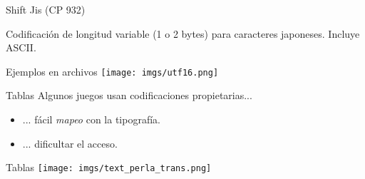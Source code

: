 \begin{frame}{Shift Jis (CP 932)}
    \begin{block}{}
        Codificación de longitud variable (1 o 2 bytes) para caracteres japoneses. Incluye ASCII.
    \end{block}
\end{frame}

\begin{frame}{Ejemplos en archivos}
    \centering\Large
    \texttt{[image: imgs/utf16.png]} \\
\end{frame}

\begin{frame}{Tablas}
    Algunos juegos usan codificaciones propietarias...
    \begin{itemize}
        \item ... fácil \textit{mapeo} con la tipografía.
        \item ... dificultar el acceso.
    \end{itemize}
\end{frame}

\begin{frame}[t,fragile]{Tablas}
    \texttt{[image: imgs/text\_perla\_trans.png]}
    \footnotesize{}
\end{frame}

